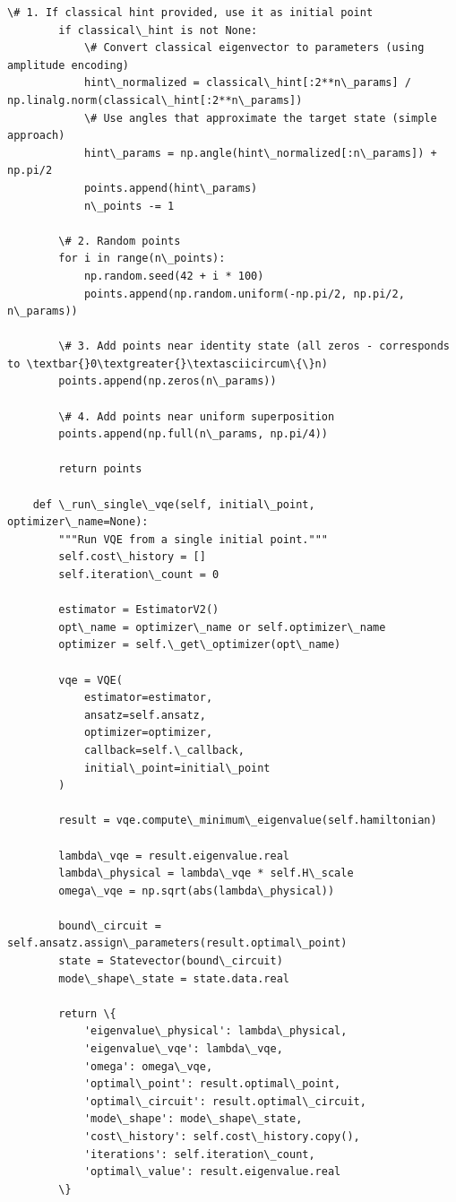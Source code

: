 \documentclass[12pt, a4paper]{article}
\begin{document}
\begin{lstlisting}[style=codestyle, caption={{vqe_runner.py --- VQE Solver}}]
        \# 1. If classical hint provided, use it as initial point
        if classical\_hint is not None:
            \# Convert classical eigenvector to parameters (using amplitude encoding)
            hint\_normalized = classical\_hint[:2**n\_params] / np.linalg.norm(classical\_hint[:2**n\_params])
            \# Use angles that approximate the target state (simple approach)
            hint\_params = np.angle(hint\_normalized[:n\_params]) + np.pi/2
            points.append(hint\_params)
            n\_points -= 1
        
        \# 2. Random points
        for i in range(n\_points):
            np.random.seed(42 + i * 100)
            points.append(np.random.uniform(-np.pi/2, np.pi/2, n\_params))
        
        \# 3. Add points near identity state (all zeros - corresponds to \textbar{}0\textgreater{}\textasciicircum\{\}n)
        points.append(np.zeros(n\_params))
        
        \# 4. Add points near uniform superposition
        points.append(np.full(n\_params, np.pi/4))
        
        return points

    def \_run\_single\_vqe(self, initial\_point, optimizer\_name=None):
        """Run VQE from a single initial point."""
        self.cost\_history = []
        self.iteration\_count = 0
        
        estimator = EstimatorV2()
        opt\_name = optimizer\_name or self.optimizer\_name
        optimizer = self.\_get\_optimizer(opt\_name)

        vqe = VQE(
            estimator=estimator,
            ansatz=self.ansatz,
            optimizer=optimizer,
            callback=self.\_callback,
            initial\_point=initial\_point
        )

        result = vqe.compute\_minimum\_eigenvalue(self.hamiltonian)
        
        lambda\_vqe = result.eigenvalue.real
        lambda\_physical = lambda\_vqe * self.H\_scale
        omega\_vqe = np.sqrt(abs(lambda\_physical))

        bound\_circuit = self.ansatz.assign\_parameters(result.optimal\_point)
        state = Statevector(bound\_circuit)
        mode\_shape\_state = state.data.real

        return \{
            'eigenvalue\_physical': lambda\_physical,
            'eigenvalue\_vqe': lambda\_vqe,
            'omega': omega\_vqe,
            'optimal\_point': result.optimal\_point,
            'optimal\_circuit': result.optimal\_circuit,
            'mode\_shape': mode\_shape\_state,
            'cost\_history': self.cost\_history.copy(),
            'iterations': self.iteration\_count,
            'optimal\_value': result.eigenvalue.real
        \}


\end{lstlisting}
\end{document}
